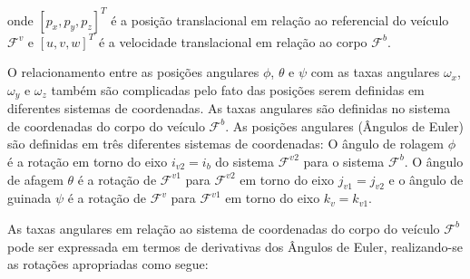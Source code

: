 \documentclass[a4paper, 12pt]{article}
\begin{document}
\noindent onde $[p_x,p_y,p_z]^T$ é a posição translacional em relação ao referencial do veículo $\mathcal{F}^{v}$ e $[u,v,w]^T$ é a velocidade translacional em relação ao corpo $\mathcal{F}^{b}$.

O relacionamento entre as posições angulares $\phi$, $\theta$ e $\psi$ com as taxas angulares $\omega_x$, $\omega_y$ e $\omega_z$ também são complicadas pelo fato das posições serem definidas em diferentes sistemas de coordenadas. As taxas angulares são definidas no sistema de coordenadas do corpo do veículo $\mathcal{F}^{b}$. As posições angulares (Ângulos de Euler) são definidas em três diferentes sistemas de coordenadas: O ângulo de rolagem $\phi$ é a rotação em torno do eixo $i_{v2} = i_{b}$ do sistema $\mathcal{F}^{v2}$ para o sistema $\mathcal{F}^{b}$. O ângulo de afagem $\theta$ é a rotação de $\mathcal{F}^{v1}$ para $\mathcal{F}^{v2}$ em torno do eixo $j_{v1} = j_{v2}$ e o ângulo de guinada $\psi$ é a rotação de $\mathcal{F}^{v}$ para $\mathcal{F}^{v1}$ em torno do eixo $k_v = k_{v1}$.

As taxas angulares em relação ao sistema de coordenadas do corpo do veículo $\mathcal{F}^{b}$ pode ser expressada em termos de derivativas dos Ângulos de Euler, realizando-se as rotações apropriadas como segue:
\end{document}
